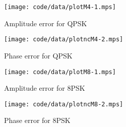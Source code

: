 \documentclass[a4paper,10pt]{article}
\begin{document}
 \begin{figure*}[tp]
 	\centering
 		\texttt{[image: code/data/plotM4-1.mps]}
 		\caption{Amplitude error for QPSK}
 		\label{fig:plotamp}
 \end{figure*}


\begin{figure*}[tp]
	\centering
		\texttt{[image: code/data/plotncM4-2.mps]}
		\caption{Phase error for QPSK}
		\label{fig:plotphase}
\end{figure*}


 \begin{figure*}[tp]
 	\centering
 		\texttt{[image: code/data/plotM8-1.mps]}
 		\caption{Amplitude error for 8PSK}
 		\label{fig:plotamp}
 \end{figure*}


\begin{figure*}[tp]
	\centering
		\texttt{[image: code/data/plotncM8-2.mps]}
		\caption{Phase error for 8PSK}
		\label{fig:plotphase}
\end{figure*}





\end{document}
